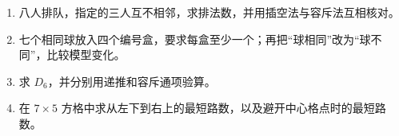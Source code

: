 \begin{exercisebox}
  \begin{enumerate}
    \item 八人排队，指定的三人互不相邻，求排法数，并用插空法与容斥法互相核对。
    \item 七个相同球放入四个编号盒，要求每盒至少一个；再把“球相同”改为“球不同”，比较模型变化。
    \item 求 $D_6$，并分别用递推和容斥通项验算。
    \item 在 $7\times5$ 方格中求从左下到右上的最短路数，以及避开中心格点时的最短路数。
  \end{enumerate}
\end{exercisebox}
